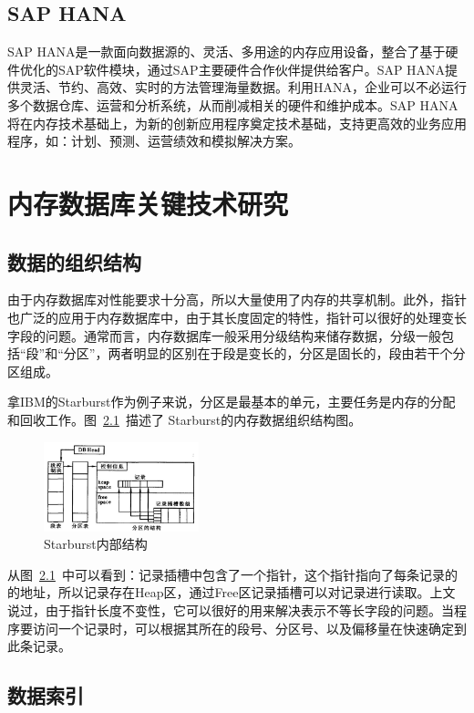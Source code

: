 \documentclass[literaturereview]{zjutreport}
\begin{document}
\section{SAP HANA}
SAP HANA\cite{ref:10}是一款面向数据源的、灵活、多用途的内存应用设备，整合了基于硬件优化的SAP软件模块，通过SAP主要硬件合作伙伴提供给客户。SAP HANA提供灵活、节约、高效、实时的方法管理海量数据。利用HANA，企业可以不必运行多个数据仓库、运营和分析系统，从而削减相关的硬件和维护成本。SAP HANA将在内存技术基础上，为新的创新应用程序奠定技术基础，支持更高效的业务应用程序，如：计划、预测、运营绩效和模拟解决方案。

\chapter{内存数据库关键技术研究}
\section{数据的组织结构}
由于内存数据库对性能要求十分高，所以大量使用了内存的共享机制。此外，指针也广泛的应用于内存数据库中，由于其长度固定的特性，指针可以很好的处理变长字段的问题。通常而言，内存数据库一般采用分级结构来储存数据，分级一般包括“段”和“分区”，两者明显的区别在于段是变长的，分区是固长的，段由若干个分区组成。

拿IBM的Starburst\cite{ref:11}作为例子来说，分区是最基本的单元，主要任务是内存的分配和回收工作。图~\ref{fig:starburst}~描述了
Starburst的内存数据组织结构图。

\begin{figure}[htbp]
\centering
\includegraphics[width=0.4\textwidth]{starburst}
\caption{Starburst内部结构}\label{fig:starburst}
\vspace{\baselineskip}
\end{figure}

从图~\ref{fig:starburst}~中可以看到：记录插槽中包含了一个指针，这个指针指向了每条记录的的地址，所以记录存在Heap区，通过Free区记录插槽可以对记录进行读取。上文说过，由于指针长度不变性，它可以很好的用来解决表示不等长字段的问题。当程序要访问一个记录时，可以根据其所在的段号、分区号、以及偏移量在快速确定到此条记录。

\section{数据索引}
\end{document}
